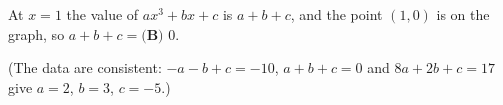 At $x=1$ the value of $ax^3+bx+c$ is $a+b+c$, and the point $(1,0)$ is on the graph, so $a+b+c=\boxed{\textbf{(B) }0}$.

(The data are consistent: $-a-b+c=-10$, $a+b+c=0$ and $8a+2b+c=17$ give $a=2$, $b=3$, $c=-5$.)
